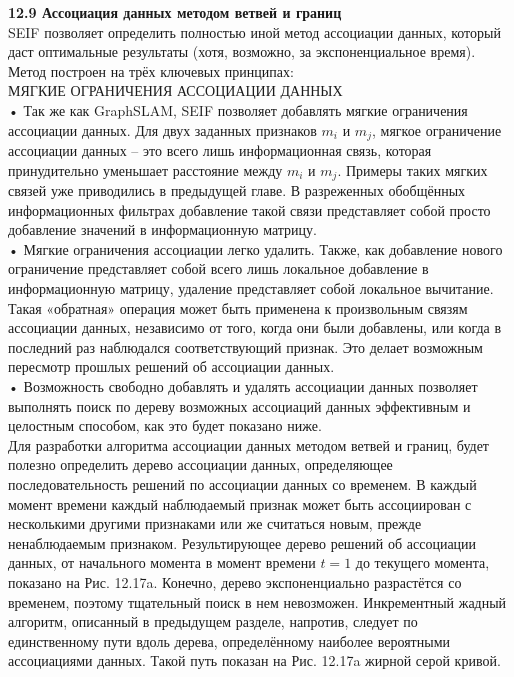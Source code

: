 \documentclass[10pt,a4paper]{article}
\begin{document}
\textbf{12.9	Ассоциация данных методом ветвей и границ}\\

SEIF позволяет определить полностью иной метод ассоциации данных, который даст оптимальные результаты (хотя, возможно, за экспоненциальное время). Метод построен на трёх ключевых принципах:\\

МЯГКИЕ ОГРАНИЧЕНИЯ АССОЦИАЦИИ ДАННЫХ\\

•	Так же как GraphSLAM, SEIF позволяет добавлять мягкие ограничения ассоциации данных. Для двух заданных признаков $m_i$ и $m_j$, мягкое ограничение ассоциации данных – это всего лишь информационная связь, которая принудительно уменьшает расстояние между $m_i$ и $m_j$. Примеры таких мягких связей уже приводились в предыдущей главе. В разреженных обобщённых информационных фильтрах добавление такой связи представляет собой просто добавление значений в информационную матрицу.\\

•	Мягкие ограничения ассоциации легко удалить. Также, как добавление нового ограничение представляет собой всего лишь локальное добавление в информационную матрицу, удаление представляет собой локальное вычитание. Такая «обратная» операция может быть применена к произвольным связям ассоциации данных, независимо от того, когда они были добавлены, или когда в последний раз наблюдался соответствующий признак. Это делает возможным пересмотр прошлых решений об ассоциации данных.\\

•	Возможность свободно добавлять и удалять ассоциации данных позволяет выполнять поиск по дереву возможных ассоциаций данных  эффективным и целостным способом, как это будет показано ниже.\\

Для разработки алгоритма ассоциации данных методом ветвей и границ, будет полезно определить дерево ассоциации данных, определяющее последовательность решений по ассоциации данных со временем. В каждый момент времени каждый наблюдаемый признак может быть ассоциирован с несколькими другими признаками или же считаться новым, прежде ненаблюдаемым признаком. Результирующее дерево решений об ассоциации данных, от начального момента в момент времени $t=1$ до текущего момента, показано на Рис. 12.17a.  Конечно, дерево экспоненциально разрастётся со временем, поэтому тщательный поиск в нем невозможен. Инкрементный жадный алгоритм, описанный в предыдущем разделе, напротив, следует по единственному пути вдоль дерева, определённому наиболее вероятными ассоциациями данных. Такой путь показан на Рис. 12.17a жирной серой кривой.
\end{document}

